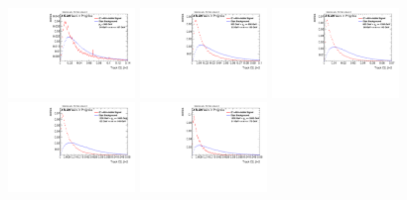\begin{figure}[H]
\includegraphics[width=0.3\textwidth]{sascha_input/Appendix/Distributions/higgs/distributions/beta2/h_normal_tj_C2_2_bin1.pdf} \hspace{1mm}
\includegraphics[width=0.3\textwidth]{sascha_input/Appendix/Distributions/higgs/distributions/beta2/h_normal_tj_C2_2_bin2.pdf} \hspace{4mm}
\includegraphics[width=0.3\textwidth]{sascha_input/Appendix/Distributions/higgs/distributions/beta2/h_normal_tj_C2_2_bin3.pdf} 
\bigskip
\includegraphics[width=0.3\textwidth]{sascha_input/Appendix/Distributions/higgs/distributions/beta2/h_normal_tj_C2_2_bin4.pdf} \hspace{4mm}
\includegraphics[width=0.3\textwidth]{sascha_input/Appendix/Distributions/higgs/distributions/beta2/h_normal_tj_C2_2_bin5.pdf} 


\end{figure}
